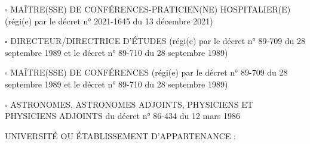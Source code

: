 \documentclass[a4paper,11pt]{article}
\newcommand{\anglaisFrancais}[2]{#2}
\newcommand{\anglaisFrancais}[2]{#1}
\newcommand{\boxunchecked}{$\square$}
\newcommand{\todoinline}[1]{\mbox{}{\color{red}{\textbf{TODO}\ifx#1\\\else:\ \fi #1}}} %
\newcommand{\todoinline}[1]{}
\begin{document}
\vspace{.5cm}

{\noindent%
\boxunchecked{}
	\anglaisFrancais{ASSOCIATE PROFESSOR-HOSPITAL DOCTOR (under French decree no. 2021-1645 of December 13, 2021)}{MAÎTRE(SSE) DE CONFÉRENCES-PRATICIEN(NE) HOSPITALIER(E) (régi(e) par le décret n° 2021-1645 du 13 décembre 2021)}
}

\ifdefined\FrenchVersion
\else
\pagebreak
\fi
%

\vspace{.5cm}
{\noindent%
\boxunchecked{}
	\anglaisFrancais{PROFESSOR at École Pratique des Hautes Études (EPHE), at École des Hautes Études en Sciences Sociales (EHESS), at École des Chartes, or at École Française d’Extrême-Orient (EFEO) under the French decree n° 89-709 of September 28, 1989 and under the French decree n° 89-710 of September 28, 1989.}{DIRECTEUR/DIRECTRICE D’ÉTUDES (régi(e) par le décret n° 89-709 du 28 septembre 1989 et le décret n° 89-710 du 28 septembre 1989)}
}

\vspace{.5cm}
{\noindent%
\boxunchecked{}
	\anglaisFrancais{ASSOCIATE PROFESSOR at École Pratique des Hautes Études (EPHE), at École des Hautes Études en Sciences Sociales (EHESS), at École des Chartes, or at École Française d’Extrême-Orient (EFEO) under the French decree n° 89-709 of September 28, 1989 and under the French decree n° 89-710 of September 28, 1989.}{MAÎTRE(SSE) DE CONFÉRENCES (régi(e) par le décret n° 89-709 du 28 septembre 1989 et le décret n° 89-710 du 28 septembre 1989)}
}

\vspace{.5cm}
{\noindent%
\boxunchecked{}
	\anglaisFrancais{ASTRONOMERS, ASSISTANT ASTRONOMERS, PHYSICISTS AND ASSISTANT PHYSICISTS under the French decree n° 86-434 of March 12, 1986.}{ASTRONOMES, ASTRONOMES ADJOINTS, PHYSICIENS ET PHYSICIENS ADJOINTS du décret n° 86-434 du 12 mars 1986}
}

\ifdefined\FrenchVersion
\pagebreak
\else
\fi

\vspace{.5cm}

{\noindent%
	\anglaisFrancais{UNIVERSITY (OR HIGHER EDUCATION INSTITUTION) AFFILIATION:}{UNIVERSITÉ OU ÉTABLISSEMENT D’APPARTENANCE :}
	\todoinline{todo}
}

\ifdefined\FrenchVersion
\else
\vspace{.5cm}
\end{document}
